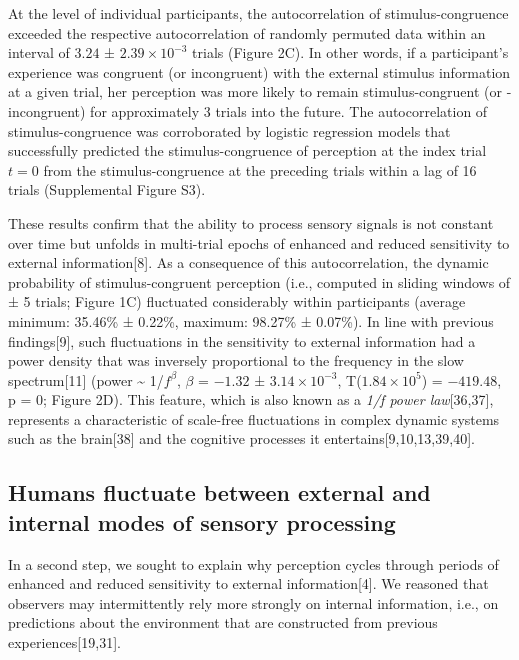 \documentclass[
]{article}
\begin{document}
At the level of individual participants, the autocorrelation of
stimulus-congruence exceeded the respective autocorrelation of randomly
permuted data within an interval of \(3.24\) ±
\(\ensuremath{2.39\times 10^{-3}}\) trials (Figure 2C). In other words,
if a participant's experience was congruent (or incongruent) with the
external stimulus information at a given trial, her perception was more
likely to remain stimulus-congruent (or -incongruent) for approximately
3 trials into the future. The autocorrelation of stimulus-congruence was
corroborated by logistic regression models that successfully predicted
the stimulus-congruence of perception at the index trial \(t = 0\) from
the stimulus-congruence at the preceding trials within a lag of 16
trials (Supplemental Figure S3).

These results confirm that the ability to process sensory signals is not
constant over time but unfolds in multi-trial epochs of enhanced and
reduced sensitivity to external information{[}8{]}. As a consequence of
this autocorrelation, the dynamic probability of stimulus-congruent
perception (i.e., computed in sliding windows of ± 5 trials; Figure 1C)
fluctuated considerably within participants (average minimum: 35.46\% ±
0.22\%, maximum: 98.27\% ± 0.07\%). In line with previous
findings{[}9{]}, such fluctuations in the sensitivity to external
information had a power density that was inversely proportional to the
frequency in the slow spectrum{[}11{]} (power \textasciitilde{}
1/\(f^\beta\), \(\beta\) = \(-1.32\) ±
\(\ensuremath{3.14\times 10^{-3}}\),
T(\(\ensuremath{1.84\times 10^{5}}\)) = \(-419.48\), p = \(0\); Figure
2D). This feature, which is also known as a \emph{1/f power
law}{[}36,37{]}, represents a characteristic of scale-free fluctuations
in complex dynamic systems such as the brain{[}38{]} and the cognitive
processes it entertains{[}9,10,13,39,40{]}.

\hypertarget{humans-fluctuate-between-external-and-internal-modes-of-sensory-processing}{%
\subsection{Humans fluctuate between external and internal modes of
sensory
processing}\label{humans-fluctuate-between-external-and-internal-modes-of-sensory-processing}}

In a second step, we sought to explain why perception cycles through
periods of enhanced and reduced sensitivity to external
information{[}4{]}. We reasoned that observers may intermittently rely
more strongly on internal information, i.e., on predictions about the
environment that are constructed from previous experiences{[}19,31{]}.
\end{document}
